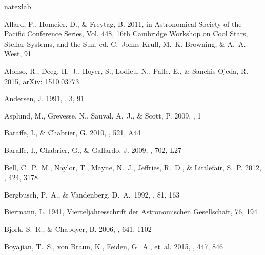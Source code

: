 \begin{thebibliography}{56}
\expandafter\ifx\csname natexlab\endcsname\relax\def\natexlab#1{#1}\fi

{Allard}, F., {Homeier}, D., \& {Freytag}, B. 2011, in Astronomical Society of
  the Pacific Conference Series, Vol. 448, 16th Cambridge Workshop on Cool
  Stars, Stellar Systems, and the Sun, ed. C.~{Johns-Krull}, M.~K. {Browning},
  \& A.~A. {West}, 91
  
{Alonso}, R., {Deeg}, H.~J., {Hoyer}, S., {Lodieu}, N., {Palle}, E., \&
  {Sanchis-Ojeda}, R. 2015, arXiv: 1510.03773

{Andersen}, J. 1991, \aapr, 3, 91

{Asplund}, M., {Grevesse}, N., {Sauval}, A.~J., \& {Scott}, P. 2009, \araa, 1

{Baraffe}, I., \& {Chabrier}, G. 2010, \aap, 521, A44

Baraffe, I., Chabrier, G., \& Gallardo, J. 2009, \apj, 702, L27

{Bell}, C.~P.~M., {Naylor}, T., {Mayne}, N.~J., {Jeffries}, R.~D., \&
  {Littlefair}, S.~P. 2012, \mnras, 424, 3178
  
 Bergbusch, P.~A., \& Vandenberg, D.~A.\ 1992, \apjs, 81, 163 

{Biermann}, L. 1941, Vierteljahresschrift der Astronomischen Gesellschaft, 76,
  194

{Bjork}, S.~R., \& {Chaboyer}, B. 2006, \apj, 641, 1102

{Boyajian}, T.~S., {von Braun}, K., {Feiden}, G.~A., {et~al.} 2015, \mnras, 447, 846


\end{thebibliography}
